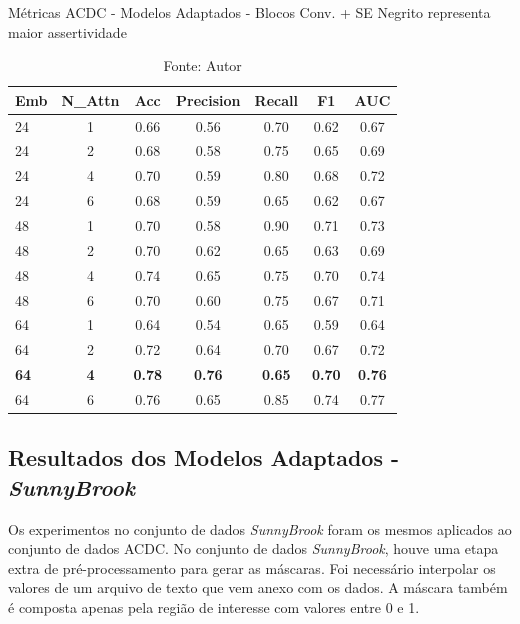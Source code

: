 \begin{table}[htbp]
\centering
\caption{Métricas ACDC - Modelos Adaptados - Blocos Conv. + SE
\newline Negrito representa maior assertividade}
\begin{tabular}{lcccccc}
\toprule
\textbf{Emb} & \textbf{N\_Attn} & \textbf{Acc} & \textbf{Precision} & \textbf{Recall} & \textbf{F1} & \textbf{AUC} \\
\midrule
24 & 1 & 0.66 & 0.56 & 0.70 & 0.62 & 0.67 \\
24 & 2 & 0.68 & 0.58 & 0.75 & 0.65 & 0.69 \\
24 & 4 & 0.70 & 0.59 & 0.80 & 0.68 & 0.72 \\
24 & 6 & 0.68 & 0.59 & 0.65 & 0.62 & 0.67 \\
\hline
48 & 1 & 0.70 & 0.58 & 0.90 & 0.71 & 0.73 \\
48 & 2 & 0.70 & 0.62 & 0.65 & 0.63 & 0.69 \\
48 & 4 & 0.74 & 0.65 & 0.75 & 0.70 & 0.74 \\
48 & 6 & 0.70 & 0.60 & 0.75 & 0.67 & 0.71 \\
\hline
64 & 1 & 0.64 & 0.54 & 0.65 & 0.59 & 0.64 \\
64 & 2 & 0.72 & 0.64 & 0.70 & 0.67 & 0.72 \\
\textbf{64} & \textbf{4} & \textbf{0.78} & \textbf{0.76} & \textbf{0.65} & \textbf{0.70} & \textbf{0.76} \\
64 & 6 & 0.76 & 0.65 & 0.85 & 0.74 & 0.77 \\
\bottomrule
\end{tabular}
\caption*{Fonte: Autor}
\label{tab:metrics_acdc_se}
\end{table}



\subsection{Resultados dos Modelos Adaptados - \textit{SunnyBrook}}
\label{subsec:resultados_sunny_adaptado}

Os experimentos no conjunto de dados \textit{SunnyBrook} foram os mesmos aplicados ao conjunto de dados \gls{ACDC}. No conjunto de dados \textit{SunnyBrook}, houve uma etapa extra de pré-processamento para gerar as máscaras. Foi necessário interpolar os valores de um arquivo de texto que vem anexo com os dados. A máscara também é composta apenas pela região de interesse com valores entre 0 e 1.

